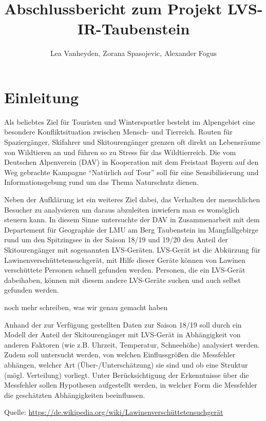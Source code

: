 \documentclass[11pt,a4paper]{report}
\title{Abschlussbericht zum Projekt LVS-IR-Taubenstein}
\author{Lea Vanheyden, Zorana Spasojevic, Alexander Fogus}
\begin{document}
	
\maketitle
	
\tableofcontents

\newpage

\chapter{Einleitung}

Als beliebtes Ziel für Touristen und Wintersportler besteht im Alpengebiet eine besondere Konfliktsituation zwischen Mensch- und Tierreich. Routen für Spaziergänger, Skifahrer und Skitourengänger grenzen oft direkt an Lebensräume von Wildtieren an und führen so zu Stress für das Wildtierreich. Die vom Deutschen Alpenverein (DAV) in Kooperation mit dem Freistaat Bayern auf den Weg gebrachte Kampagne "`Natürlich auf Tour"' soll für eine Sensibilisierung und Informationsgebung rund um das Thema Naturschutz dienen.

Neben der Aufklärung ist ein weiteres Ziel dabei, das Verhalten der menschlichen Besucher zu analysieren um daraus abzuleiten inwiefern man es womöglich steuern kann. In diesem Sinne untersuchte der DAV in Zusammenarbeit mit dem Departement für Geographie der LMU am Berg Taubenstein im Mangfallgebirge rund um den Spitzingsee in der Saison 18/19 und 19/20 den Anteil der Skitourengänger mit sogenannten LVS-Geräten. LVS-Gerät ist die Abkürzung für Lawinenverschüttetensuchgerät, mit Hilfe dieser Geräte können von Lawinen verschüttete Personen schnell gefunden werden. Personen, die ein LVS-Gerät dabeihaben, können mit diesem andere LVS-Geräte suchen und auch selbst gefunden werden.

noch mehr schreiben, was wir genau gemacht haben

Anhand der zur Verfügung gestellten Daten zur Saison 18/19 soll durch ein Modell der Anteil der Skitourengänger mit LVS-Gerät in Abhängigkeit von anderen Faktoren (wie z.B. Uhrzeit, Temperatur, Schneehöhe) analysiert werden.
Zudem soll untersucht werden, von welchen Einflussgrößen die Messfehler abhängen, welcher Art (Über-/Unterschätzung) sie sind und ob eine Struktur (mögl. Verteilung) vorliegt.
Unter Berücksichtigung der Erkenntnisse über die Messfehler sollen Hypothesen aufgestellt werden, in welcher Form die Messfehler die geschätzten Abhängigkeiten beeinflussen.

Quelle:
\url{https://de.wikipedia.org/wiki/Lawinenverschüttetensuchgerät}
\end{document}
